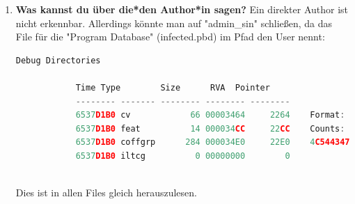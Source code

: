 \documentclass{article}
\begin{document}
\begin{enumerate}
\begin{enumerate}
\begin{enumerate}
			\end{enumerate}
			\item infected-md.exe
			\begin{enumerate}
				\item .text
				\item .rdata
				\item .data
				\item .pdata
				\item .rsrc
				\item .reloc
			\end{enumerate}
			\item infected-MDd.exe
			\begin{enumerate}
				\item .text
				\item .rdata
				\item .data
				\item .pdata
				\item .rsrc
				\item .reloc
			\end{enumerate}
		\end{enumerate}
		
		\pagebreak
		
		\item \textbf{Was kannst du über die*den Author*in sagen?}
		Ein direkter Author ist nicht erkennbar. Allerdings könnte man auf "admin\_sin" schließen, da das File für die "Program Database" (infected.pbd) im Pfad den User nennt:\\
		\begin{lstlisting}[language=c]
			 Debug Directories
			
			Time Type        Size      RVA  Pointer
			-------- ------- -------- -------- --------
			6537D1B0 cv            66 00003464     2264    Format: RSDS, {6F72B84A-D687-4743-A104-E88EF40E7E96}, 4, C:\Users\admin_sin\Desktop\rev3-s2210239021\infected\x64\Release\infected.pdb
			6537D1B0 feat          14 000034CC     22CC    Counts: Pre-VC++ 11.00=0, C/C++=30, /GS=30, /sdl=1, guardN=29
			6537D1B0 coffgrp      284 000034E0     22E0    4C544347 (LTCG)
			6537D1B0 iltcg          0 00000000        0
			
		\end{lstlisting}
		
		\noindent Dies ist in allen Files gleich herauszulesen.\\
		

\end{enumerate}
\end{document}

